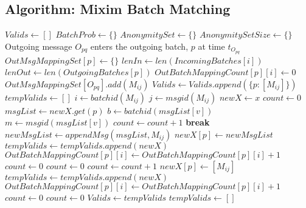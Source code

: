 \documentclass{article}
\begin{document}
\subsection{Algorithm: Mixim Batch Matching}
\vspace{0.5em}

\begin{algorithmic}[1]
\State $Valids \gets [] $
\State $BatchProb \gets \{ \} $
\State $ AnonymitySet \gets \{ \} $
\State $ AnonymitySetSize \gets \{ \} $
\State Outgoing message $O_{pq}$ enters the outgoing batch, $p$ at time $t_{O_{pq}}$
\State $OutMsgMappingSet [p] \gets \{ \} $
    \State $ lenIn \gets len(IncomingBatches[i]) $
    \State $ lenOut \gets len(OutgoingBatches[p]) $
        \State $OutBatchMappingCount[p][i] \gets 0 $
    \EndIf
\EndFor
{}
            \State $ OutMsgMappingSet[O_{pq}].add(M_{ij}) $
        \EndIf
    \EndFor
\EndFor
{}
        \State $Valids \gets Valids.append(\{ p: [M_{ij}] \} )$
    \EndFor
\Else
    \State $tempValids \gets []$
        \State $ i \gets batchid(M_{ij}) $
        \State $ j \gets msgid(M_{ij}) $
            \State $ newX \gets x $
            \State $count \gets 0$
            \State $ msgList \gets newX.get(p) $
                    \State $ b \gets batchid(msgList[v]) $
                    \State $ m \gets msgid(msgList[v]) $
                        \State $count \gets count + 1$
                    \Else
                        \State \textbf{break}
                    \EndIf
                \EndFor
                    \State $ newMsgList \gets appendMsg( msgList,M_{ij})$
                    \State $newX[p] \gets newMsgList $
                    \State $tempValids \gets tempValids.append(newX)$
                    \State $ OutBatchMappingCount[p][i] \gets OutBatchMappingCount[p][i] + 1$
                    \State $count \gets 0$
                \Else
                    \State $count \gets 0$
                \EndIf
            \Else
                        \State $count \gets count + 1$
                    \EndIf
                \EndFor
                    \State $newX [p] \gets  [M_{ij}] $
                    \State $ tempValids \gets tempValids.append(newX) $
                    \State $ OutBatchMappingCount[p][i] \gets OutBatchMappingCount[p][i] + 1 $
                    \State $count \gets 0$
                \Else
                    \State $count \gets 0$
                \EndIf
            \EndIf
        \EndFor
    \EndFor
    \State $ Valids \gets tempValids $
    \State $ tempValids \gets [] $
\EndIf


\end{algorithmic}
\end{document}
